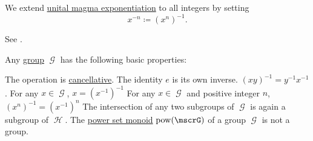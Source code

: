 \begin{definition}
\begin{thmenum}
     We extend \hyperref[def:unital_magma/exponentiation]{unital magma exponentiation} to all integers by setting
    \begin{equation*}
      x^{-n} \coloneqq (x^n)^{-1}.
    \end{equation*}

    See .
  \end{thmenum}
\end{definition}

\begin{proposition}\label{thm:group_properties}
  Any \hyperref[def:group]{group} \( \mscrG \) has the following basic properties:
  \begin{thmenum}
     The operation is \hyperref[def:magma/cancellative]{cancellative}.
     The identity \( e \) is its own inverse.
     \( (xy)^{-1} = y^{-1} x^{-1} \).
     For any \( x \in \mscrG \), \( x = (x^{-1})^{-1} \)
     For any \( x \in \mscrG \) and positive integer \( n \), \( (x^n)^{-1} = (x^{-1})^n \)
     The intersection of any two subgroups of \( \mscrG \) is again a subgroup of \( \mscrH \).
     The \hyperref[def:magma/power_set]{power set monoid} \( \pow(\mscrG) \) of a group \( \mscrG \) is not a group.
  \end{thmenum}
\end{proposition}
